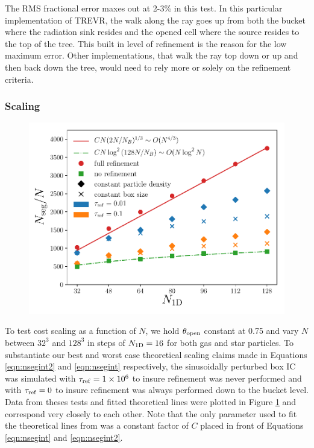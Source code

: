 \documentclass[fleq,usenatbib]{mnras}
\newcommand{\acro}{TREVR}
\providecommand{\e}[1]{\ensuremath{\times10^{#1}}}
\newcommand{\tr}{\tau_{\rm ref}}
\newcommand{\tO}{\theta_{\rm open}}
\begin{document}
The RMS fractional error maxes out at 2-3\% in this test. In this particular 
implementation of \acro{}, the walk along the ray goes up from both the bucket 
where the radiation sink resides and the opened cell where the source resides 
to the top of the tree. This built in level of refinement is the reason for 
the low maximum error. Other implementations, that walk the ray top down or up 
and then back down the tree, would need to rely more or solely on the 
refinement criteria. 

\subsubsection{Scaling}
\begin{figure}
\includegraphics[width=1\linewidth]{Figures/particle_scaling.pdf}
\caption{}
\label{fig:pscale}
\end{figure}
To test cost scaling as a function of $N$, we hold $\tO$ constant at 0.75 and
vary $N$ between $32^3$ and $128^3$ in steps of $N_{\rm 1D} = 16$ for both gas 
and star particles. To substantiate our best and worst case theoretical 
scaling claims made in Equations \ref{eqn:nsegint2} and \ref{eqn:nsegint} 
respectively, the sinusoidally perturbed box IC was simulated with $\tr=1\e 6$ 
to insure refinement was never performed and with $\tr=0$ to insure refinement 
was always performed down to the bucket level. Data from theses tests and 
fitted theoretical lines were plotted in Figure \ref{fig:pscale} and 
correspond very closely to each other. Note that the only parameter used to 
fit the theoretical lines from was a constant factor of $C$ placed in front of 
Equations \ref{eqn:nsegint} and \ref{eqn:nsegint2}.
\end{document}
